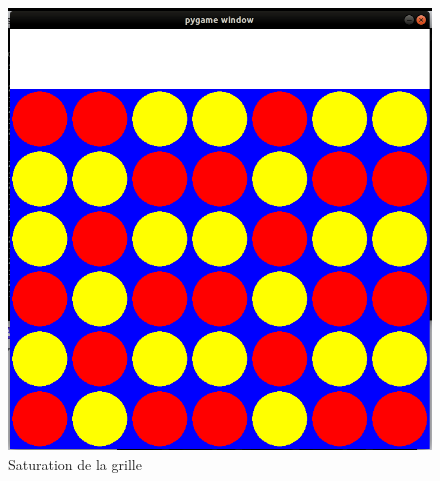 \documentclass[a4paper]{article}
\begin{document}
\begin{figure}[h!]
\begin{minipage}[c]{0.60\linewidth}
   \end{minipage}\hfill
   \begin{minipage}[c]{0.60\linewidth}   
      \centering \includegraphics[scale=0.15]{draw.png}
      \caption{Saturation de la grille}

      \end{minipage}


   \end{figure}
\end{document}
